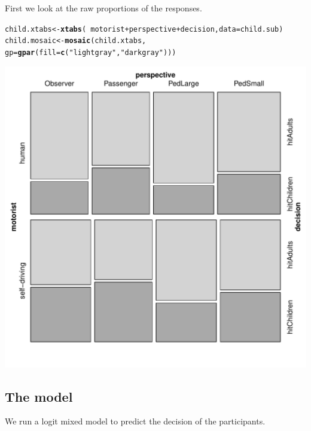 \documentclass{scrartcl}\usepackage[]{graphicx}\usepackage[]{color}
\makeatletter
\def\maxwidth{ %
  \ifdim\Gin@nat@width>\linewidth
    \linewidth
  \else
    \Gin@nat@width
  \fi
}
\newcommand{\hlstr}[1]{\textcolor[rgb]{0.192,0.494,0.8}{#1}}%
\newcommand{\hlopt}[1]{\textcolor[rgb]{0,0,0}{#1}}%
\newcommand{\hlstd}[1]{\textcolor[rgb]{0.345,0.345,0.345}{#1}}%
\newcommand{\hlkwb}[1]{\textcolor[rgb]{0.69,0.353,0.396}{#1}}%
\newcommand{\hlkwc}[1]{\textcolor[rgb]{0.333,0.667,0.333}{#1}}%
\newcommand{\hlkwd}[1]{\textcolor[rgb]{0.737,0.353,0.396}{\textbf{#1}}}%
\newenvironment{kframe}{%
 \def\at@end@of@kframe{}%
 \ifinner\ifhmode%
  \def\at@end@of@kframe{\end{minipage}}%
  \begin{minipage}{\columnwidth}%
 \fi\fi%
 \def\FrameCommand##1{\hskip\@totalleftmargin \hskip-\fboxsep
 \colorbox{shadecolor}{##1}\hskip-\fboxsep
     \hskip-\linewidth \hskip-\@totalleftmargin \hskip\columnwidth}%
 \MakeFramed {\advance\hsize-\width
   \@totalleftmargin\z@ \linewidth\hsize
   \@setminipage}}%
 {\par\unskip\endMakeFramed%
 \at@end@of@kframe}
\newenvironment{knitrout}{}{} %
\makeatother
\begin{document}
First we look at the raw proportions of the responses.
\begin{knitrout}
\color{fgcolor}\begin{kframe}
\begin{alltt}
\hlstd{child.xtabs} \hlkwb{<-} \hlkwd{xtabs}\hlstd{(}\hlopt{~} \hlstd{motorist} \hlopt{+} \hlstd{perspective} \hlopt{+} \hlstd{decision,} \hlkwc{data} \hlstd{= child.sub)}
\hlstd{child.mosaic} \hlkwb{<-} \hlkwd{mosaic}\hlstd{(child.xtabs,}
                       \hlkwc{gp} \hlstd{=} \hlkwd{gpar}\hlstd{(}\hlkwc{fill} \hlstd{=} \hlkwd{c}\hlstd{(}\hlstr{"light gray"}\hlstd{,} \hlstr{"dark gray"}\hlstd{)))}
\end{alltt}
\end{kframe}
\includegraphics[width=\maxwidth]{figure/child-mosaic-1} 

\end{knitrout}

\subsection{The model}
\label{sec:child-model}

We run a logit mixed model to predict the decision of the participants.
\end{document}
